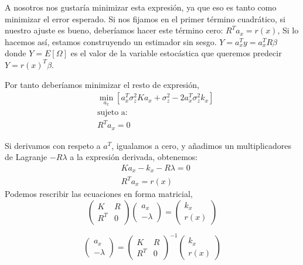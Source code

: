 \documentclass[10pt,a4paper]{report}
\begin{document}
A nosotros nos gustaría minimizar esta expresión, ya que eso es tanto como minimizar el error esperado. Si nos fijamos en el primer término cuadrático, si nuestro ajuste es bueno, deberíamos hacer este término cero: $R^Ta_x = r(x)$, Si lo hacemos así, estamos construyendo un estimador sin sesgo. $Y= a_x^Ty = a_x^TR\beta$ donde $Y = E[\Omega]$ es el valor de la variable estocástica que queremos predecir $Y = r(x)^T\beta$.

Por tanto deberíamos minimizar el resto de expresión,
\begin{equation}
\begin{split}
&\min_{a_x}\left[{a_x^T\sigma_z^2 Ka_x+\sigma_z^2-2a_x^T\sigma_z^2 k_x}\right]\\
&\text{sujeto a:}\\
& R^Ta_x = 0
\end{split}
\end{equation}

Si derivamos con respeto a $a^T$, igualamos a cero, y añadimos un multiplicadores de Lagranje $-R\lambda$ a la expresión derivada, obtenemos:
\begin{equation}
\begin{split}
&Ka_x - k_x-R\lambda = 0\\
&R^Ta_x = r(x)
\end{split}
\end{equation} 
Podemos rescribir las ecuaciones en forma matricial,
\begin{equation}
\begin{pmatrix}
K & R\\
R^T & 0
\end{pmatrix} \begin{pmatrix}
a_x \\ -\lambda
\end{pmatrix}= \begin{pmatrix}k_x \\ r(x)
\end{pmatrix}
\end{equation}

\begin{equation}
 \begin{pmatrix}
a_x \\ -\lambda
\end{pmatrix}= \begin{pmatrix}
K & R\\
R^T & 0
\end{pmatrix}^{-1}\begin{pmatrix} k_x \\ r(x)
\end{pmatrix}
\end{equation}
\end{document}
